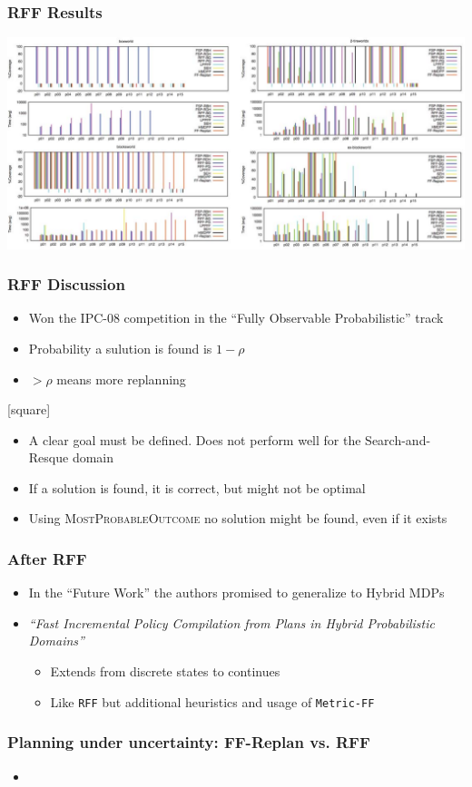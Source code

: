 \documentclass{beamer}
\let\origframetitle=\frametitle
\renewcommand\frametitle[1]{\origframetitle{\textbf{\large{\textrm{#1}}}}}
\begin{document}
\begin{frame}
  \frametitle{RFF Results}

  \includegraphics[width=\textwidth]{images/rff-results.pdf}
\end{frame}

\begin{frame}
  \frametitle{RFF Discussion}

  \begin{itemize}
    \item Won the IPC-08 competition in the ``Fully Observable Probabilistic'' track
    \item Probability a sulution is found is $1 - \rho$
    \item $> \rho$ means more replanning
  \end{itemize}

  [square]
  \begin{itemize}
    \item A clear goal must be defined. Does not perform well for the Search-and-Resque domain
    \item If a solution is found, it is correct, but might not be optimal
    \item Using \textsc{MostProbableOutcome} no solution might be found, even if it exists
  \end{itemize}

\end{frame}

\begin{frame}
  \frametitle{After RFF}

  \begin{itemize}
    \item In the ``Future Work'' the authors promised to generalize to Hybrid MDPs
    \item \emph{``Fast Incremental Policy Compilation from Plans in Hybrid Probabilistic Domains''}
      \begin{itemize}
        \item Extends from discrete states to continues
        \item Like \texttt{RFF} but additional heuristics and usage of \texttt{Metric-FF}
      \end{itemize}
  \end{itemize}

\end{frame}

\begin{frame}
  \frametitle{Planning under uncertainty: FF-Replan vs. RFF}

  \begin{itemize}
    \item
  \end{itemize}
\end{frame}



\end{document}
